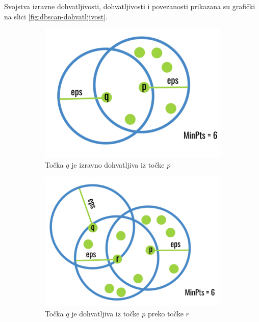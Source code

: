 \documentclass[utf8, diplomski, numeric]{fer}
\begin{document}
Svojstva izravne dohvatljivosti, dohvatljivosti i povezanosti prikazana su grafički na slici \ref{fig:dbscan-dohvatljivost}.

\begin{figure}[htp]
\begin{subfigure}{.3\textwidth}
\centering
\includegraphics[width=1\textwidth]{images/dbscan1.png}
\caption{Točka $q$ je izravno dohvatljiva iz točke $p$}
\end{subfigure}
\begin{subfigure}{.3\textwidth}
\centering
\includegraphics[width=1\textwidth]{images/dbscan2.png}
\caption{Točka $q$ je dohvatljiva iz točke $p$ preko točke $r$}
\end{subfigure}
\begin{subfigure}{.3\textwidth}

\end{subfigure}
\end{figure}
\end{document}
